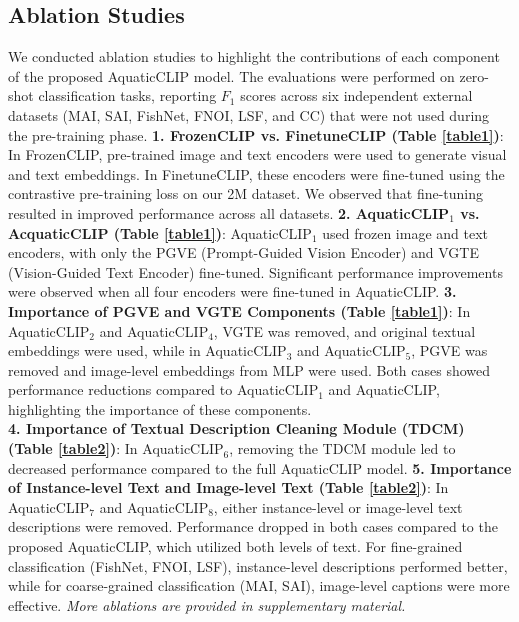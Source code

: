 \subsection{Ablation Studies}
We conducted ablation studies to highlight the contributions of each component of the proposed AquaticCLIP model. 
The evaluations were performed on zero-shot classification tasks, reporting $F_{1}$ scores across six independent external datasets (MAI, SAI, FishNet, FNOI, LSF, and CC) that were not used during the pre-training phase. \noindent \textbf{1. FrozenCLIP vs. FinetuneCLIP (Table \ref{table1})}: In FrozenCLIP, pre-trained image and text encoders were used to generate visual and text embeddings. 
In FinetuneCLIP, these encoders were fine-tuned using the contrastive pre-training loss on our 2M dataset. 
We observed that fine-tuning resulted in improved performance across all datasets.
\noindent \textbf{2. AquaticCLIP$_{1}$ vs. AcquaticCLIP (Table \ref{table1})}: AquaticCLIP$_{1}$ used frozen image and text encoders, with only the PGVE (Prompt-Guided Vision Encoder) and VGTE (Vision-Guided Text Encoder) fine-tuned. 
Significant performance improvements were observed when all four encoders were fine-tuned in AquaticCLIP. \noindent \textbf{3. Importance of PGVE and VGTE Components (Table \ref{table1})}: In AquaticCLIP$_{2}$ and AquaticCLIP$_{4}$, VGTE was removed, and original textual embeddings were used, while in AquaticCLIP$_{3}$ and AquaticCLIP$_{5}$, PGVE was removed and image-level embeddings from MLP were used. 
Both cases showed performance reductions compared to AquaticCLIP$_{1}$ and AquaticCLIP, highlighting the importance of these components.\\
\noindent \textbf{4. Importance of Textual Description Cleaning Module (TDCM) (Table \ref{table2})}: In AquaticCLIP$_{6}$, removing the TDCM module led to decreased performance compared to the full AquaticCLIP model. \noindent \textbf{5. Importance of Instance-level Text and Image-level Text (Table \ref{table2})}: In AquaticCLIP$_{7}$ and AquaticCLIP$_{8}$, either instance-level or image-level text descriptions were removed. 
Performance dropped in both cases compared to the proposed AquaticCLIP, which utilized both levels of text. 
For fine-grained classification (FishNet, FNOI, LSF), instance-level descriptions performed better, while for coarse-grained classification (MAI, SAI), image-level captions were more effective.
\textit{More ablations are provided in supplementary material.}


